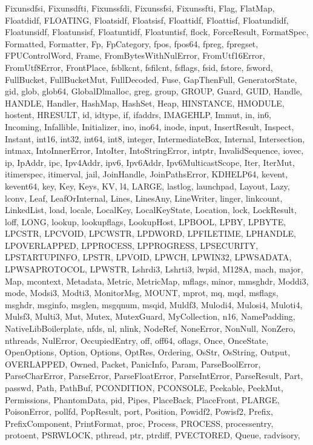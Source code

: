 {{Fixunsdfsi, Fixunsdfti, Fixunssfdi, Fixunssfsi, Fixunssfti, Flag, FlatMap,
Floatdidf, FLOATING, Floatsidf, Floatsisf, Floattidf, Floattisf, Floatundidf,
Floatunsidf, Floatunsisf, Floatuntidf, Floatuntisf, flock, ForceResult,
FormatSpec, Formatted, Formatter, Fp, FpCategory, fpos, fpos64, fpreg, fpregset,
FPUControlWord, Frame, FromBytesWithNulError, FromUtf16Error, FromUtf8Error,
FrontPlace, fsblkcnt, fsfilcnt, fsflags, fsid, fstore, fsword, FullBucket,
FullBucketMut, FullDecoded, Fuse, GapThenFull, GeneratorState, gid, glob,
glob64, GlobalDlmalloc, greg, group, GROUP, Guard, GUID, Handle, HANDLE,
Handler, HashMap, HashSet, Heap, HINSTANCE, HMODULE, hostent, HRESULT, id,
idtype, if, ifaddrs, IMAGEHLP, Immut, in, in6, Incoming, Infallible,
Initializer, ino, ino64, inode, input, InsertResult, Inspect, Instant, int16,
int32, int64, int8, integer, IntermediateBox, Internal, Intersection, intmax,
IntoInnerError, IntoIter, IntoStringError, intptr, InvalidSequence, iovec, ip,
IpAddr, ipc, Ipv4Addr, ipv6, Ipv6Addr, Ipv6MulticastScope, Iter, IterMut,
itimerspec, itimerval, jail, JoinHandle, JoinPathsError, KDHELP64, kevent,
kevent64, key, Key, Keys, KV, l4, LARGE, lastlog, launchpad, Layout, Lazy,
lconv, Leaf, LeafOrInternal, Lines, LinesAny, LineWriter, linger, linkcount,
LinkedList, load, locale, LocalKey, LocalKeyState, Location, lock, LockResult,
loff, LONG, lookup, lookupflags, LookupHost, LPBOOL, LPBY, LPBYTE, LPCSTR,
LPCVOID, LPCWSTR, LPDWORD, LPFILETIME, LPHANDLE, LPOVERLAPPED, LPPROCESS,
LPPROGRESS, LPSECURITY, LPSTARTUPINFO, LPSTR, LPVOID, LPWCH, LPWIN32, LPWSADATA,
LPWSAPROTOCOL, LPWSTR, Lshrdi3, Lshrti3, lwpid, M128A, mach, major, Map,
mcontext, Metadata, Metric, MetricMap, mflags, minor, mmsghdr, Moddi3, mode,
Modsi3, Modti3, MonitorMsg, MOUNT, mprot, mq, mqd, msflags, msghdr, msginfo,
msglen, msgqnum, msqid, Muldf3, Mulodi4, Mulosi4, Muloti4, Mulsf3, Multi3, Mut,
Mutex, MutexGuard, MyCollection, n16, NamePadding, NativeLibBoilerplate, nfds,
nl, nlink, NodeRef, NoneError, NonNull, NonZero, nthreads, NulError,
OccupiedEntry, off, off64, oflags, Once, OnceState, OpenOptions, Option,
Options, OptRes, Ordering, OsStr, OsString, Output, OVERLAPPED, Owned, Packet,
PanicInfo, Param, ParseBoolError, ParseCharError, ParseError, ParseFloatError,
ParseIntError, ParseResult, Part, passwd, Path, PathBuf, PCONDITION, PCONSOLE,
Peekable, PeekMut, Permissions, PhantomData, pid, Pipes, PlaceBack, PlaceFront,
PLARGE, PoisonError, pollfd, PopResult, port, Position, Powidf2, Powisf2,
Prefix, PrefixComponent, PrintFormat, proc, Process, PROCESS, processentry,
protoent, PSRWLOCK, pthread, ptr, ptrdiff, PVECTORED, Queue, radvisory,
}}
